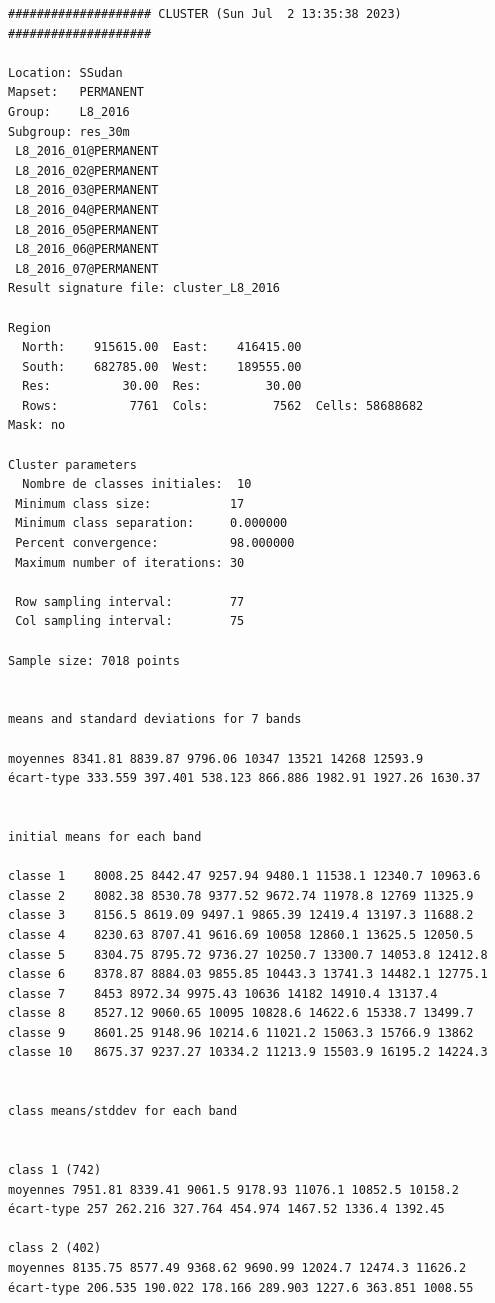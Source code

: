 \documentclass[analytics,article,accept,pdftex,moreauthors]{Definitions/mdpi}
\begin{document}
\begin{footnotesize}
\begin{verbatim}
#################### CLUSTER (Sun Jul  2 13:35:38 2023) ####################

Location: SSudan
Mapset:   PERMANENT
Group:    L8_2016
Subgroup: res_30m
 L8_2016_01@PERMANENT
 L8_2016_02@PERMANENT
 L8_2016_03@PERMANENT
 L8_2016_04@PERMANENT
 L8_2016_05@PERMANENT
 L8_2016_06@PERMANENT
 L8_2016_07@PERMANENT
Result signature file: cluster_L8_2016

Region
  North:    915615.00  East:    416415.00
  South:    682785.00  West:    189555.00
  Res:          30.00  Res:         30.00
  Rows:          7761  Cols:         7562  Cells: 58688682
Mask: no

Cluster parameters
  Nombre de classes initiales: 	10
 Minimum class size:           17
 Minimum class separation:     0.000000
 Percent convergence:          98.000000
 Maximum number of iterations: 30

 Row sampling interval:        77
 Col sampling interval:        75

Sample size: 7018 points


means and standard deviations for 7 bands

moyennes 8341.81 8839.87 9796.06 10347 13521 14268 12593.9
écart-type 333.559 397.401 538.123 866.886 1982.91 1927.26 1630.37


initial means for each band

classe 1    8008.25 8442.47 9257.94 9480.1 11538.1 12340.7 10963.6
classe 2    8082.38 8530.78 9377.52 9672.74 11978.8 12769 11325.9
classe 3    8156.5 8619.09 9497.1 9865.39 12419.4 13197.3 11688.2
classe 4    8230.63 8707.41 9616.69 10058 12860.1 13625.5 12050.5
classe 5    8304.75 8795.72 9736.27 10250.7 13300.7 14053.8 12412.8
classe 6    8378.87 8884.03 9855.85 10443.3 13741.3 14482.1 12775.1
classe 7    8453 8972.34 9975.43 10636 14182 14910.4 13137.4
classe 8    8527.12 9060.65 10095 10828.6 14622.6 15338.7 13499.7
classe 9    8601.25 9148.96 10214.6 11021.2 15063.3 15766.9 13862
classe 10   8675.37 9237.27 10334.2 11213.9 15503.9 16195.2 14224.3


class means/stddev for each band


class 1 (742)
moyennes 7951.81 8339.41 9061.5 9178.93 11076.1 10852.5 10158.2
écart-type 257 262.216 327.764 454.974 1467.52 1336.4 1392.45

class 2 (402)
moyennes 8135.75 8577.49 9368.62 9690.99 12024.7 12474.3 11626.2
écart-type 206.535 190.022 178.166 289.903 1227.6 363.851 1008.55


\end{verbatim}
\end{footnotesize}
\end{document}
